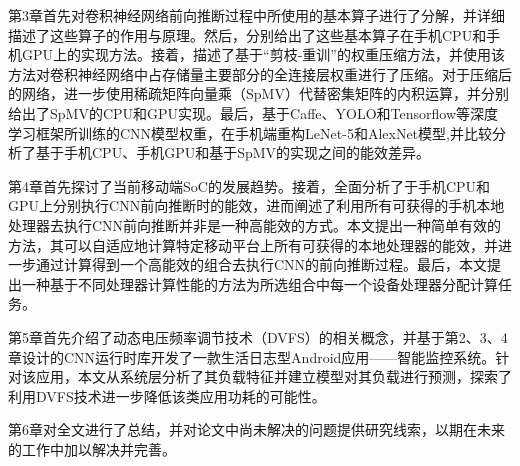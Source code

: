 第3章首先对卷积神经网络前向推断过程中所使用的基本算子进行了分解，并详细描述了这些算子的作用与原理。然后，分别给出了这些基本算子在手机CPU和手机GPU上的实现方法。接着，描述了基于“剪枝-重训”的权重压缩方法，并使用该方法对卷积神经网络中占存储量主要部分的全连接层权重进行了压缩。对于压缩后的网络，进一步使用稀疏矩阵向量乘（SpMV）代替密集矩阵的内积运算，并分别给出了SpMV的CPU和GPU实现。最后，基于Caffe、YOLO和Tensorflow等深度学习框架所训练的CNN模型权重，在手机端重构LeNet-5\cite{lecun1998gradient}和AlexNet\cite{krizhevsky2012imagenet}模型,并比较分析了基于手机CPU、手机GPU和基于SpMV的实现之间的能效差异。

第4章首先探讨了当前移动端SoC的发展趋势。接着，全面分析了于手机CPU和GPU上分别执行CNN前向推断时的能效，进而阐述了利用所有可获得的手机本地处理器去执行CNN前向推断并非是一种高能效的方式。本文提出一种简单有效的方法，其可以自适应地计算特定移动平台上所有可获得的本地处理器的能效，并进一步通过计算得到一个高能效的组合去执行CNN的前向推断过程。最后，本文提出一种基于不同处理器计算性能的方法为所选组合中每一个设备处理器分配计算任务。

第5章首先介绍了动态电压频率调节技术（DVFS）的相关概念，并基于第2、3、4章设计的CNN运行时库开发了一款生活日志型Android应用——智能监控系统。针对该应用，本文从系统层分析了其负载特征并建立模型对其负载进行预测，探索了利用DVFS技术进一步降低该类应用功耗的可能性。

第6章对全文进行了总结，并对论文中尚未解决的问题提供研究线索，以期在未来的工作中加以解决并完善。

\cleardoublepage